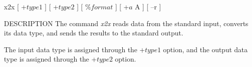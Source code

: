 % 
% 
% 
% 
%                                                                        
%

\begin{synopsis}
\item[x2x] [ +$type1$ ] [ +$type2$ ] [ $\%format$ ] [ +$a$ A ] [ --r ]
\end{synopsis}

\begin{qsection}{DESCRIPTION}
The command {\em x2x} reads data from the standard input,
converts its data type, and sends the results to the standard
output.
\par
The input data type is assigned through the +$type1$ option,
and the output data type is assigned through the +$type2$ option.
\end{qsection}


